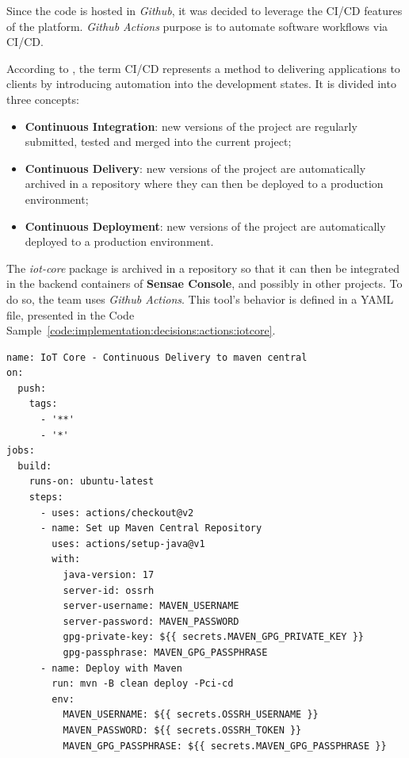 Since the code is hosted in \textit{Github}, it was decided to leverage the CI/CD features of the platform. \textit{Github Actions} purpose is to automate software workflows via CI/CD.

According to \cite{cicd}, the term CI/CD represents a method to delivering applications to clients by introducing automation into the development states.
It is divided into three concepts:

\begin{itemize}
    \item \textbf{Continuous Integration}: new versions of the project are regularly submitted, tested and merged into the current project;
    \item \textbf{Continuous Delivery}: new versions of the project are automatically archived in a repository where they can then be deployed to a production environment;
    \item \textbf{Continuous Deployment}: new versions of the project are automatically deployed to a production environment.
\end{itemize}

The \textit{iot-core} package is archived in a repository so that it can then be integrated in the backend containers of \textbf{Sensae Console}, and possibly in other projects. To do so, the team uses \textit{Github Actions}. This tool's behavior is defined in a YAML file, presented in the Code Sample~\ref{code:implementation:decisions:actions:iotcore}.

\begin{lstlisting}[style=yaml, caption=Configuration File for \textit{iot-core} Continuous Delivery, label={code:implementation:decisions:actions:iotcore}]
name: IoT Core - Continuous Delivery to maven central
on:
  push:
    tags:        
      - '**'
      - '*'
jobs:
  build:
    runs-on: ubuntu-latest
    steps:
      - uses: actions/checkout@v2
      - name: Set up Maven Central Repository
        uses: actions/setup-java@v1
        with:
          java-version: 17
          server-id: ossrh
          server-username: MAVEN_USERNAME
          server-password: MAVEN_PASSWORD
          gpg-private-key: ${{ secrets.MAVEN_GPG_PRIVATE_KEY }}
          gpg-passphrase: MAVEN_GPG_PASSPHRASE
      - name: Deploy with Maven
        run: mvn -B clean deploy -Pci-cd
        env:
          MAVEN_USERNAME: ${{ secrets.OSSRH_USERNAME }}
          MAVEN_PASSWORD: ${{ secrets.OSSRH_TOKEN }}
          MAVEN_GPG_PASSPHRASE: ${{ secrets.MAVEN_GPG_PASSPHRASE }}
\end{lstlisting}

